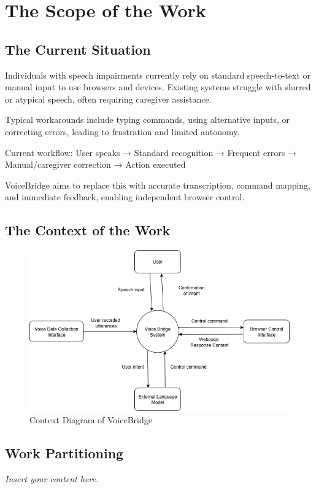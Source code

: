 \documentclass[12pt]{article}
\newcommand{\lips}{\textit{Insert your content here.}}
\begin{document}
\section{The Scope of the Work}
\subsection{The Current Situation}

Individuals with speech impairments currently rely on standard speech-to-text or manual input to use browsers and devices. Existing systems struggle with slurred or atypical speech, often requiring caregiver assistance.

Typical workarounds include typing commands, using alternative inputs, or correcting errors, leading to frustration and limited autonomy.

Current workflow:
User speaks → Standard recognition → Frequent errors → Manual/caregiver correction → Action executed

VoiceBridge aims to replace this with accurate transcription, command mapping, and immediate feedback, enabling independent browser control.

\subsection{The Context of the Work}

\begin{figure}[H]
\centering
\includegraphics[width=1\textwidth]{../imgs/VoiceBridge_context_diagram.png}
\caption{Context Diagram of VoiceBridge}
\label{fig:voicebridge-context}
\end{figure}

\subsection{Work Partitioning}
\lips
\end{document}

